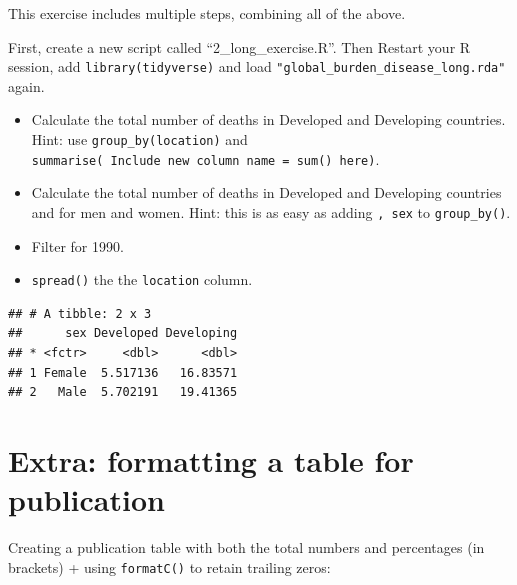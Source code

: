 \documentclass[]{book}
\providecommand{\tightlist}{%
  \setlength{\itemsep}{0pt}\setlength{\parskip}{0pt}}
\begin{document}
This exercise includes multiple steps, combining all of the above.

First, create a new script called ``2\_long\_exercise.R''. Then Restart
your R session, add \texttt{library(tidyverse)} and load
\texttt{"global\_burden\_disease\_long.rda"} again.

\begin{itemize}
\tightlist
\item
  Calculate the total number of deaths in Developed and Developing
  countries. Hint: use \texttt{group\_by(location)} and
  \texttt{summarise(\ Include\ new\ column\ name\ =\ sum()\ here)}.
\item
  Calculate the total number of deaths in Developed and Developing
  countries and for men and women. Hint: this is as easy as adding
  \texttt{,\ sex} to \texttt{group\_by()}.
\item
  Filter for 1990.
\item
  \texttt{spread()} the the \texttt{location} column.
\end{itemize}

\begin{verbatim}
## # A tibble: 2 x 3
##      sex Developed Developing
## * <fctr>     <dbl>      <dbl>
## 1 Female  5.517136   16.83571
## 2   Male  5.702191   19.41365
\end{verbatim}

\section{Extra: formatting a table for
publication}\label{extra-formatting-a-table-for-publication}

Creating a publication table with both the total numbers and percentages
(in brackets) + using \texttt{formatC()} to retain trailing zeros:
\end{document}
